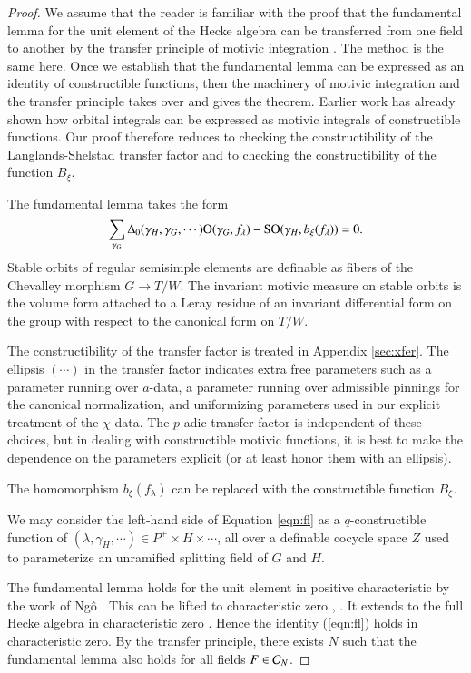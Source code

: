 \begin{proof}
  We assume that the reader is familiar with the proof that the
  fundamental lemma for the unit element of the Hecke algebra can be
  transferred from one field to another by the transfer principle of
  motivic integration \cite{cluckers2011transfer}.  The method is the
  same here.  Once we establish that the fundamental lemma can be
  expressed as an identity of constructible functions, then the
  machinery of motivic integration and the transfer principle takes
  over and gives the theorem.  Earlier work has already shown how
  orbital integrals can be expressed as motivic integrals of
  constructible functions.  Our proof therefore reduces to checking
  the constructibility of the Langlands-Shelstad transfer factor and
  to checking the constructibility of the function $B_\xi$.

  The fundamental lemma takes the form
\begin{equation}\label{eqn:fl}
\sum_{\gamma_G}\Delta_0(\gamma_H,\gamma_G,\cdots)
{\operatorname{O}}(\gamma_G,f_\lambda) - {\operatorname{SO}}(\gamma_H,b_\xi(f_\lambda)) = 0.
\end{equation}
Stable orbits of regular semisimple elements are definable as fibers
of the Chevalley morphism $G\to T/W$.  The invariant motivic measure
on stable orbits is the volume form attached to a Leray residue of an
invariant differential form on the group with respect to the canonical
form on $T/W$.  

The constructibility of the transfer factor is treated in Appendix
\ref{sec:xfer}.  The ellipsis $(\cdots)$ in the transfer factor
indicates extra free parameters such as a parameter running over
$a$-data, a parameter running over admissible pinnings for the
canonical normalization, and uniformizing parameters used in our
explicit treatment of the $\chi$-data.  The $p$-adic transfer factor
is independent of these choices, but in dealing with constructible
motivic functions, it is best to make the dependence on the parameters
explicit (or at least honor them with an ellipsis).

The homomorphism $b_\xi(f_\lambda)$ can be replaced with
the constructible function $B_\xi$.

We may consider the left-hand side of Equation \ref{eqn:fl} as a
$q$-constructible function of $(\lambda,\gamma_H,\cdots)\in P^+\times
H\times\cdots$, all over a definable cocycle space $Z$ used to
parameterize an unramified splitting field of $G$ and $H$.

The fundamental lemma holds for the unit element in positive
characteristic by the work of Ng\^o \cite{ngo2010lemme}.  This can be
lifted to characteristic zero \cite{cluckers2011transfer},
\cite{waldspurger2006endoscopie}.  It extends to the full Hecke
algebra in characteristic zero \cite{hales1995fundamental}.  Hence the
identity (\ref{eqn:fl}) holds in characteristic zero.  By the transfer
principle, there exists $N$ such that the fundamental lemma also holds
for all fields $F\in\mathcal C_N$.


\end{proof}
